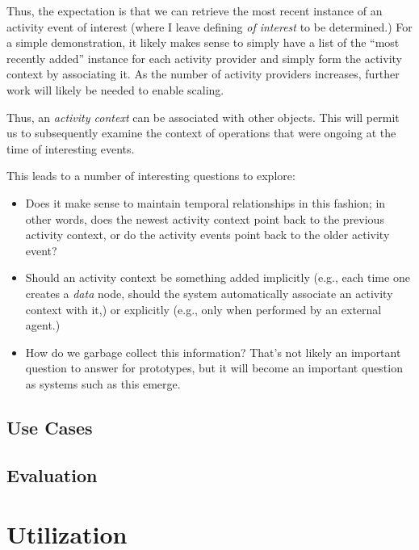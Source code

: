 \documentclass[sigconf,anonymous,review]{acmart}
\begin{document}
Thus, the expectation is that we can retrieve the most recent instance of an
activity event of interest (where I leave defining \emph{of interest} to be
determined.)  For a simple demonstration, it likely makes sense to simply have a
list of the ``most recently added'' instance for each activity provider and
simply form the activity context by associating it.  As the number of activity
providers increases, further work will likely be needed to enable scaling.

Thus, an \emph{activity context} can be associated with other objects.  This
will permit us to subsequently examine the context of operations that were
ongoing at the time of interesting events.

This leads to a number of interesting questions to explore:

\begin{itemize}
    \item Does it make sense to maintain temporal relationships in this fashion;
    in other words, does the newest activity context point back to the previous
    activity context, or do the activity events point back to the older activity
    event?

    \item Should an activity context be something added implicitly (e.g., each
    time one creates a \emph{data} node, should the system automatically
    associate an activity context with it,) or explicitly (e.g., only when
    performed by an external agent.)

    \item How do we garbage collect this information?  That's not likely an
    important question to answer for prototypes, but it will become an important
    question as systems such as this emerge.

\end{itemize}

\subsection{Use Cases}

\subsection{Evaluation}

\section{Utilization}
\label{sec:utilization}
\end{document}

